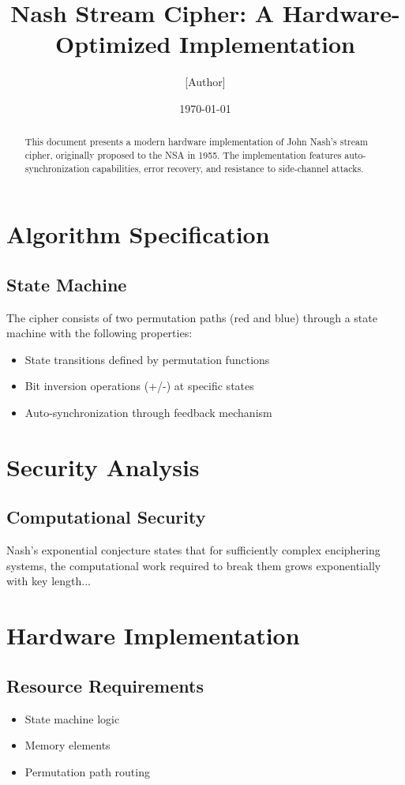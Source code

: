 \documentclass[11pt]{article}
\title{Nash Stream Cipher: A Hardware-Optimized Implementation}
\author{[Author]}
\date{\today}
\begin{document}
\maketitle

\begin{abstract}
This document presents a modern hardware implementation of John Nash's stream cipher, originally proposed to the NSA in 1955. The implementation features auto-synchronization capabilities, error recovery, and resistance to side-channel attacks.
\end{abstract}

\section{Algorithm Specification}
\subsection{State Machine}
The cipher consists of two permutation paths (red and blue) through a state machine with the following properties:
\begin{itemize}
    \item State transitions defined by permutation functions
    \item Bit inversion operations (+/-) at specific states
    \item Auto-synchronization through feedback mechanism
\end{itemize}

\section{Security Analysis}
\subsection{Computational Security}
Nash's exponential conjecture states that for sufficiently complex enciphering systems, the computational work required to break them grows exponentially with key length...

\section{Hardware Implementation}
\subsection{Resource Requirements}
\begin{itemize}
    \item State machine logic
    \item Memory elements
    \item Permutation path routing
\end{itemize}
\end{document}
